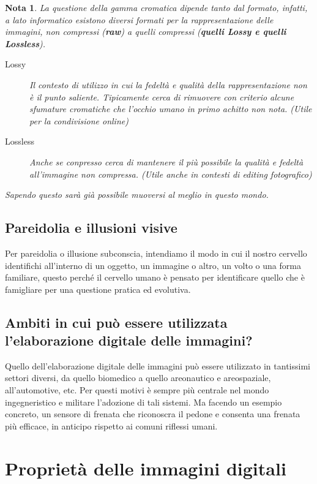 \documentclass{report}
\newtheorem{nota}{Nota}
\begin{document}
\begin{nota}
  La questione della gamma cromatica dipende tanto dal formato, infatti,
  a lato informatico esistono diversi formati per la rappresentazione
  delle immagini, non compressi (\textbf{\color{red}raw}) a quelli
  compressi (\textbf{\color{blue}quelli Lossy e quelli Lossless}).
  \begin{description}
  \item[Lossy] Il contesto di utilizzo in cui la fedeltà e qualità della
    rappresentazione non è il punto saliente. Tipicamente cerca di
    rimuovere con criterio alcune sfumature cromatiche che l'occhio umano
    in primo achitto non nota. (Utile per la condivisione online)
  \item[Lossless] Anche se conpresso cerca di mantenere il più possibile
    la qualità e fedeltà all'immagine non compressa. (Utile anche in
    contesti di editing fotografico)
  \end{description}
  Sapendo questo sarà già possibile muoversi al meglio in questo mondo.
\end{nota}

\section{Pareidolia e illusioni visive}
\label{sec:pareidolia}
Per pareidolia o illusione subconscia, intendiamo il modo in cui il
nostro cervello identifichi all'interno di un oggetto, un immagine o
altro, un volto o una forma familiare, questo perché il cervello umano
è pensato per identificare quello che è famigliare per una questione
pratica ed evolutiva.

\section{Ambiti in cui può essere utilizzata l'elaborazione digitale
  delle immagini?}
\label{sec:ambito}
Quello dell'elaborazione digitale delle immagini può essere utilizzato in
tantissimi settori diversi, da quello biomedico a quello areonautico e
areospaziale, all'automotive, etc. Per questi motivi è sempre più
centrale nel mondo ingegneristico e militare l'adozione di tali sistemi.
Ma facendo un esempio concreto, un sensore di frenata che riconoscra il
pedone e consenta una frenata più efficace, in anticipo rispetto ai
comuni riflessi umani.

\chapter{Proprietà delle immagini digitali}
\label{chap:propdelimmdig}
\end{document}
